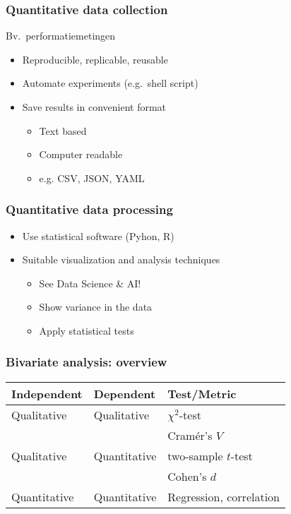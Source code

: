\documentclass[aspectratio=169]{beamer}
\begin{document}
\begin{frame}
  \frametitle{Quantitative data collection}

  Bv.\ performatiemetingen

  \begin{itemize}
    \item Reproducible, replicable, reusable
    \item Automate experiments (e.g.\ shell script)
    \item Save results in convenient format
    \begin{itemize}
        \item Text based
        \item Computer readable
        \item e.g. CSV, JSON, YAML
    \end{itemize}
  \end{itemize}

\end{frame}

\begin{frame}
  \frametitle{Quantitative data processing}

  \begin{itemize}
    \item Use statistical software (Pyhon, R)
    \item Suitable visualization and analysis techniques
    \begin{itemize}
        \item See Data Science \& AI!
        \item Show variance in the data
        \item Apply statistical tests
    \end{itemize}
  \end{itemize}

\end{frame}
  
\begin{frame}
  \frametitle{Bivariate analysis: overview}
  \centering
  \begin{tabular}{lll}
    \toprule
    \textbf{Independent} & \textbf{Dependent} & \textbf{Test/Metric}    \\
    \midrule
    Qualitative          & Qualitative        & $\chi^2$-test           \\
                         &                    & Cramér's $V$            \\
    Qualitative          & Quantitative       & two-sample $t$-test     \\
                         &                    & Cohen's $d$             \\
    Quantitative         & Quantitative       & Regression, correlation \\
    \bottomrule
  \end{tabular}

  \bigskip

\end{frame}
\end{document}
